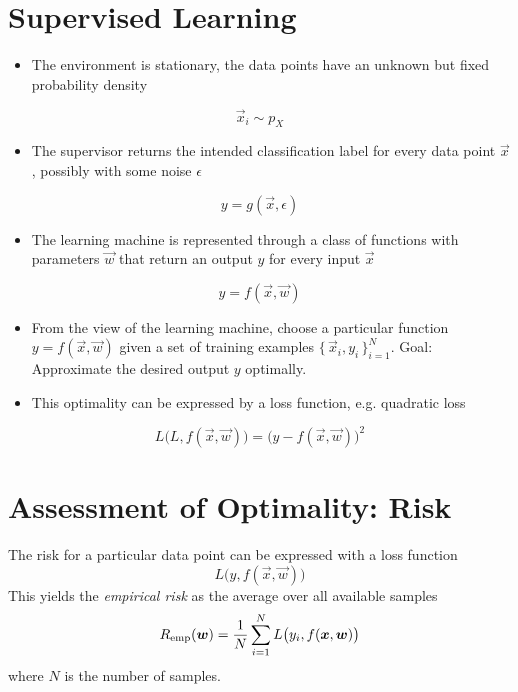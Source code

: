 	\section{Supervised Learning}
		\begin{itemize}
			\item The environment is stationary, the data points have an unknown but fixed probability density
		\end{itemize}
		\begin{equation}
			\vec{x}_i \sim p_X
		\end{equation}
		\begin{itemize}
			\item The supervisor returns the intended classification label for every data point \(\vec{x}\), possibly with some noise \( \epsilon \)
		\end{itemize}
		\begin{equation}
			y = g(\vec{x}, \epsilon)
		\end{equation}
		\begin{itemize}
			\item The learning machine is represented through a class of functions with parameters \(\vec{w}\) that return an output \(y\) for every input \(\vec{x}\)
		\end{itemize}
		\begin{equation}
			y = f(\vec{x}, \vec{w})
		\end{equation}

		\begin{itemize}
			\item From the view of the learning machine, choose a particular function \( y = f(\vec{x}, \vec{w}) \) given a set of training examples \( \{\, \vec{x}_i, y_i \,\}_{i = 1}^N \). Goal: Approximate the desired output \(y\) optimally.
			\item This optimality can be expressed by a loss function, e.g. quadratic loss
		\end{itemize}
		\begin{equation}
			L\big(L, f(\vec{x}, \vec{w})\big) = \big(y - f(\vec{x}, \vec{w})\big)^2
		\end{equation}

	\section{Assessment of Optimality: Risk}
		The risk for a particular data point can be expressed with a loss function
		\begin{equation}
			L\big(y, f(\vec{x}, \vec{w})\big)
		\end{equation}
		This yields the \emph{empirical risk} as the average over all available samples
		\begin{equation}
			R_{{\operatorname{emp}}}(\bm{w}) = \frac{1}{N} \sum_{i = 1}^{N} L\big(y_i, f(\bm{x}, \bm{w})\big)
		\end{equation}
		where \(N\) is the number of samples.


